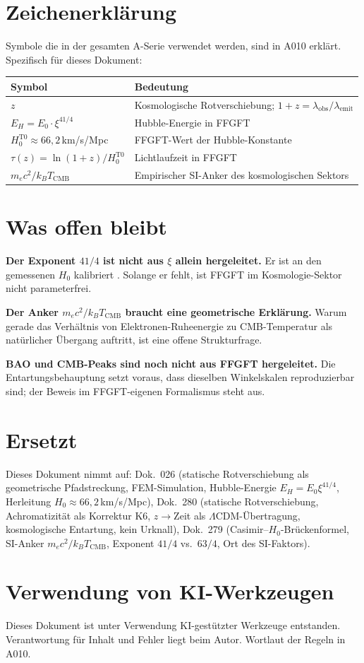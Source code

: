 \section{Zeichenerklärung}

Symbole die in der gesamten A-Serie verwendet werden, sind in A010 erklärt.
Spezifisch für dieses Dokument:

\begin{center}
\renewcommand{\arraystretch}{1.3}
{\small\begin{tabular}{lp{9cm}}
\toprule
Symbol & Bedeutung \\
\midrule
$z$ & Kosmologische Rotverschiebung; $1+z=\lambda_\text{obs}/\lambda_\text{emit}$ \\
$E_H = E_0\cdot\xi^{41/4}$ & Hubble-Energie in FFGFT \\
$H_0^\text{T0}\approx66{,}2\,$km/s/Mpc & FFGFT-Wert der Hubble-Konstante \\
$\tau(z) = \ln(1+z)/H_0^\text{T0}$ & Lichtlaufzeit in FFGFT \\
$m_ec^2/k_BT_\text{CMB}$ & Empirischer SI-Anker des kosmologischen Sektors \\
\bottomrule
\end{tabular}}
\renewcommand{\arraystretch}{1.0}
\end{center}

\section{Was offen bleibt}

\textbf{Der Exponent $41/4$ ist nicht aus $\xi$ allein hergeleitet.} Er ist an
den gemessenen $H_0$ kalibriert . Solange er fehlt, ist FFGFT im
Kosmologie-Sektor nicht parameterfrei.

\textbf{Der Anker $m_ec^2/k_BT_\text{CMB}$ braucht eine geometrische Erklärung.}
Warum gerade das Verhältnis von Elektronen-Ruheenergie zu CMB-Temperatur als
natürlicher Übergang auftritt, ist eine offene Strukturfrage.

\textbf{BAO und CMB-Peaks sind noch nicht aus FFGFT hergeleitet.} Die
Entartungsbehauptung setzt voraus, dass dieselben Winkelskalen reproduzierbar sind;
der Beweis im FFGFT-eigenen Formalismus steht aus.

\section{Ersetzt}

Dieses Dokument nimmt auf: Dok.~026 (statische Rotverschiebung als geometrische
Pfadstreckung, FEM-Simulation, Hubble-Energie $E_H=E_0\xi^{41/4}$, Herleitung
$H_0\approx66{,}2\,$km/s/Mpc), Dok.~280 (statische Rotverschiebung, Achromatizität
als Korrektur K6, $z\to$Zeit als $\Lambda$CDM-Übertragung, kosmologische Entartung,
kein Urknall), Dok.~279 (Casimir--$H_0$-Brückenformel, SI-Anker
$m_ec^2/k_BT_\text{CMB}$, Exponent $41/4$ vs.\ $63/4$, Ort des SI-Faktors).

\section{Verwendung von KI-Werkzeugen}

Dieses Dokument ist unter Verwendung KI-gestützter Werkzeuge entstanden.
Verantwortung für Inhalt und Fehler liegt beim Autor. Wortlaut der Regeln in A010.
